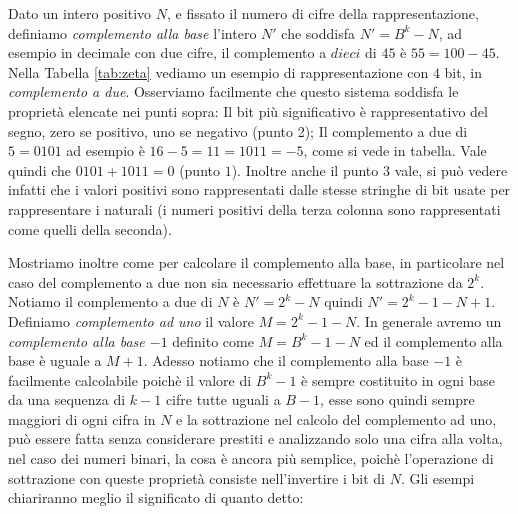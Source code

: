 Dato un intero positivo $N$, e fissato il numero di cifre della
rappresentazione, definiamo \emph{complemento alla base} l'intero $N'$ che
soddisfa $N'= B^k-N$, ad esempio in decimale con due cifre, il complemento a
$dieci$ di $45$ è $55 = 100-45$. Nella Tabella \ref{tab:zeta} vediamo un
esempio di rappresentazione con $4$ bit, in \emph{complemento a due}.
Osserviamo facilmente che questo sistema soddisfa le proprietà elencate nei
punti sopra: Il bit più significativo è rappresentativo del segno, zero se
positivo, uno se negativo (punto 2); Il complemento a due di $5 = 0101$ ad
esempio è $16-5 = 11 = 1011 = -5$, come si vede in tabella. Vale quindi che
$0101+1011 = 0$ (punto $1$). Inoltre anche il punto $3$ vale, si può vedere
infatti che i valori positivi sono rappresentati dalle stesse stringhe di bit
usate per rappresentare i naturali (i numeri positivi della terza colonna sono
rappresentati come quelli della seconda).

Mostriamo inoltre come per calcolare il complemento alla base, in particolare
nel caso del complemento a due non sia necessario effettuare la sottrazione da
$2^k$. Notiamo il complemento a due di $N$ è $N' = 2^k - N$ quindi $N' =
2^k-1-N+1$. Definiamo \emph{complemento ad uno} il valore $M = 2^k-1-N$. In
generale avremo un \emph{complemento alla base $-1$} definito come $M =
B^k-1-N$ ed il complemento alla base è uguale a $M+1$. Adesso notiamo che il
complemento alla base $-1$ è facilmente calcolabile poichè il valore di $B^k-1$
è sempre costituito in ogni base da una sequenza di $k-1$ cifre tutte uguali a
$B-1$, esse sono quindi sempre maggiori di ogni cifra in $N$ e la sottrazione
nel calcolo del complemento ad uno, può essere fatta senza considerare prestiti
e analizzando solo una cifra alla volta, nel caso dei numeri binari, la cosa è
ancora più semplice, poichè l'operazione di sottrazione con queste proprietà
consiste nell'invertire i bit di $N$. Gli esempi chiariranno meglio il
significato di quanto detto:


